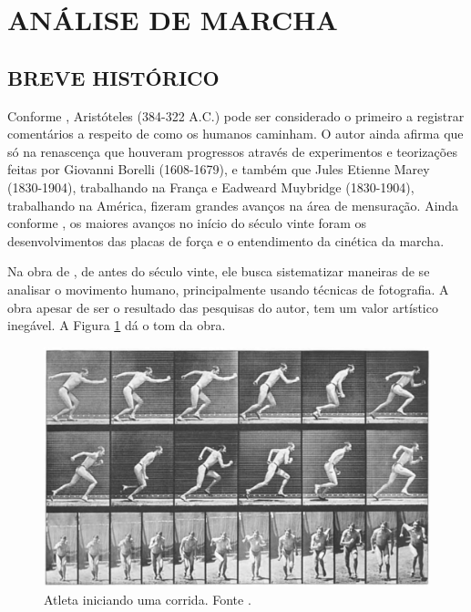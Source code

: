 \section{ANÁLISE DE MARCHA}


\subsection{BREVE HISTÓRICO} 

Conforme , Aristóteles (384-322 A.C.) pode ser considerado o primeiro a registrar comentários a respeito de como os humanos caminham. 
O autor ainda afirma que só na renascença que houveram progressos através de experimentos e teorizações feitas por Giovanni Borelli (1608-1679), e também que Jules Etienne Marey (1830-1904), trabalhando na França e Eadweard Muybridge (1830-1904), trabalhando na América, fizeram grandes avanços na área de mensuração.
Ainda conforme , os maiores avanços no início do século vinte foram os desenvolvimentos das placas de força e o entendimento da cinética da marcha.

Na obra de , de antes do século vinte, ele busca sistematizar maneiras de se analisar o movimento humano, principalmente usando técnicas de fotografia. 
A obra apesar de ser o resultado das pesquisas do autor, tem um valor artístico inegável.  
A Figura \ref{inicio_corrida} dá o tom da obra.

\begin{figure}[ht]
	\centering
	\includegraphics[width=15cm]{figuras/inicio_corrida.eps}
	\caption{Atleta iniciando uma corrida. Fonte \cite{Muybridge1885}.}
	\label{inicio_corrida}
\end{figure}


